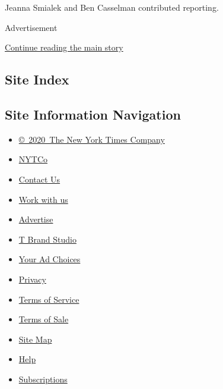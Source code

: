 Jeanna Smialek and Ben Casselman contributed reporting.

Advertisement

\protect\hyperlink{after-bottom}{Continue reading the main story}

\hypertarget{site-index}{%
\subsection{Site Index}\label{site-index}}

\hypertarget{site-information-navigation}{%
\subsection{Site Information
Navigation}\label{site-information-navigation}}

\begin{itemize}
\tightlist
\item
  \href{https://help.nytimes3xbfgragh.onion/hc/en-us/articles/115014792127-Copyright-notice}{©~2020~The
  New York Times Company}
\end{itemize}

\begin{itemize}
\tightlist
\item
  \href{https://www.nytco.com/}{NYTCo}
\item
  \href{https://help.nytimes3xbfgragh.onion/hc/en-us/articles/115015385887-Contact-Us}{Contact
  Us}
\item
  \href{https://www.nytco.com/careers/}{Work with us}
\item
  \href{https://nytmediakit.com/}{Advertise}
\item
  \href{http://www.tbrandstudio.com/}{T Brand Studio}
\item
  \href{https://www.nytimes3xbfgragh.onion/privacy/cookie-policy\#how-do-i-manage-trackers}{Your
  Ad Choices}
\item
  \href{https://www.nytimes3xbfgragh.onion/privacy}{Privacy}
\item
  \href{https://help.nytimes3xbfgragh.onion/hc/en-us/articles/115014893428-Terms-of-service}{Terms
  of Service}
\item
  \href{https://help.nytimes3xbfgragh.onion/hc/en-us/articles/115014893968-Terms-of-sale}{Terms
  of Sale}
\item
  \href{https://spiderbites.nytimes3xbfgragh.onion}{Site Map}
\item
  \href{https://help.nytimes3xbfgragh.onion/hc/en-us}{Help}
\item
  \href{https://www.nytimes3xbfgragh.onion/subscription?campaignId=37WXW}{Subscriptions}
\end{itemize}
